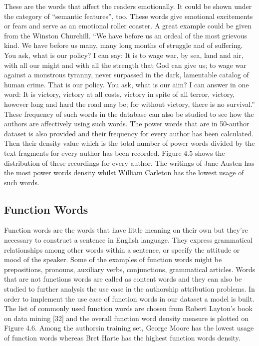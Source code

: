 These are the words that affect the readers emotionally. It could be shown under the category of “semantic features”, too. These words give emotional excitements or fears and serve as an emotional roller coaster. A great example could be given from the Winston Churchill.
“We have before us an ordeal of the most grievous kind. We have before us many, many long months of struggle and of suffering. You ask, what is our policy? I can say: It is to wage war, by sea, land and air, with all our might and with all the strength that God can give us; to wage war against a monstrous tyranny, never surpassed in the dark, lamentable catalog of human crime. That is our policy. You ask, what is our aim? I can answer in one word: It is victory, victory at all costs, victory in spite of all terror, victory, however long and hard the road may be; for without victory, there is no survival.”
These frequency of such words in the database can also be studied to see how the authors are affectively using such words. 
The power words that are in 50-author dataset is also provided and their frequency for every author has been calculated.
Then their density value which is the total number of power words divided by the text fragments for every author has been recorded. Figure 4.5 shows the distribution of these recordings for every author. The writings of Jane Austen has the most power words density whilst William Carleton has the lowest usage of such words.

\subsection{Function Words}

Function words are the words that have little meaning on their own but they’re necessary to construct a sentence in English language. They express grammatical relationships among other words within a sentence, or specify the attitude or mood of the speaker. Some of the examples of function words might be prepositions, pronouns, auxiliary verbs, conjunctions, grammatical articles. Words that are not functions words are called as content words and they can also be studied to further analysis the use case in the authorship attribution problems. In order to implement the use case of function words in our dataset a model is built. The list of commonly used function words are chosen from Robert Layton’s book on data mining [32] and the overall function word density measure is plotted on Figure 4.6. Among the authorsin training set, George Moore has the lowest usage of function words whereas Bret Harte has the highest function words density.

